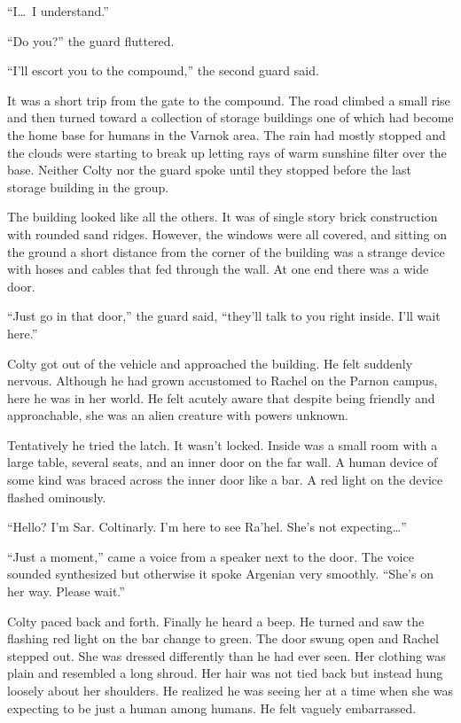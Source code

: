 ``I\ldots\ I understand.''

``Do you?'' the guard fluttered.

``I'll escort you to the compound,'' the second guard said.

It was a short trip from the gate to the compound. The road climbed a small rise and then turned
toward a collection of storage buildings one of which had become the home base for humans in the
Varnok area. The rain had mostly stopped and the clouds were starting to break up letting rays
of warm sunshine filter over the base. Neither Colty nor the guard spoke until they stopped
before the last storage building in the group.

The building looked like all the others. It was of single story brick construction with rounded
sand ridges. However, the windows were all covered, and sitting on the ground a short distance
from the corner of the building was a strange device with hoses and cables that fed through the
wall. At one end there was a wide door.

``Just go in that door,'' the guard said, ``they'll talk to you right inside. I'll wait here.''

Colty got out of the vehicle and approached the building. He felt suddenly nervous. Although he
had grown accustomed to Rachel on the Parnon campus, here he was in her world. He felt acutely
aware that despite being friendly and approachable, she was an alien creature with powers
unknown.

Tentatively he tried the latch. It wasn't locked. Inside was a small room with a large table,
several seats, and an inner door on the far wall. A human device of some kind was braced across
the inner door like a bar. A red light on the device flashed ominously.

``Hello? I'm Sar. Coltinarly. I'm here to see Ra'hel. She's not expecting\ldots''

``Just a moment,'' came a voice from a speaker next to the door. The voice sounded synthesized
but otherwise it spoke Argenian very smoothly. ``She's on her way. Please wait.''

Colty paced back and forth. Finally he heard a beep. He turned and saw the flashing red light on
the bar change to green. The door swung open and Rachel stepped out. She was dressed differently
than he had ever seen. Her clothing was plain and resembled a long shroud. Her hair was not tied
back but instead hung loosely about her shoulders. He realized he was seeing her at a time when
she was expecting to be just a human among humans. He felt vaguely embarrassed.

